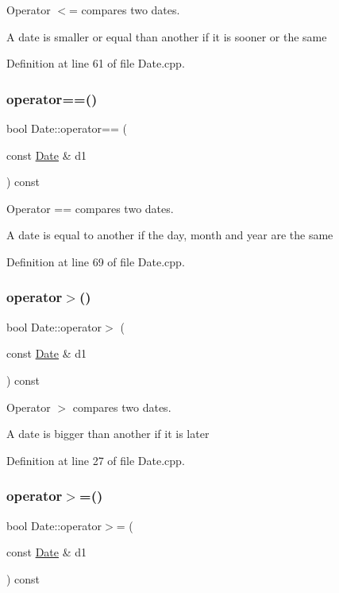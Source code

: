 Operator $<$= compares two dates. 

A date is smaller or equal than another if it is sooner or the same 

Definition at line 61 of file Date.\+cpp.

\hypertarget{class_date_ac906e253d7d1343e3e161fb9e1aee707}{}\label{class_date_ac906e253d7d1343e3e161fb9e1aee707} 
\subsubsection{\texorpdfstring{operator==()}{operator==()}}
{\footnotesize\ttfamily bool Date\+::operator== (\begin{DoxyParamCaption}\item[{const \hyperlink{class_date}{Date} \&}]{d1 }\end{DoxyParamCaption}) const}



Operator == compares two dates. 

A date is equal to another if the day, month and year are the same 

Definition at line 69 of file Date.\+cpp.

\hypertarget{class_date_aa4c0f619e51dca5ef53284e548d4d0af}{}\label{class_date_aa4c0f619e51dca5ef53284e548d4d0af} 
\subsubsection{\texorpdfstring{operator$>$()}{operator>()}}
{\footnotesize\ttfamily bool Date\+::operator$>$ (\begin{DoxyParamCaption}\item[{const \hyperlink{class_date}{Date} \&}]{d1 }\end{DoxyParamCaption}) const}



Operator $>$ compares two dates. 

A date is bigger than another if it is later 

Definition at line 27 of file Date.\+cpp.

\hypertarget{class_date_ae5a781b0f45775eece17d7f3dd5b3703}{}\label{class_date_ae5a781b0f45775eece17d7f3dd5b3703} 
\subsubsection{\texorpdfstring{operator$>$=()}{operator>=()}}
{\footnotesize\ttfamily bool Date\+::operator$>$= (\begin{DoxyParamCaption}\item[{const \hyperlink{class_date}{Date} \&}]{d1 }\end{DoxyParamCaption}) const}



